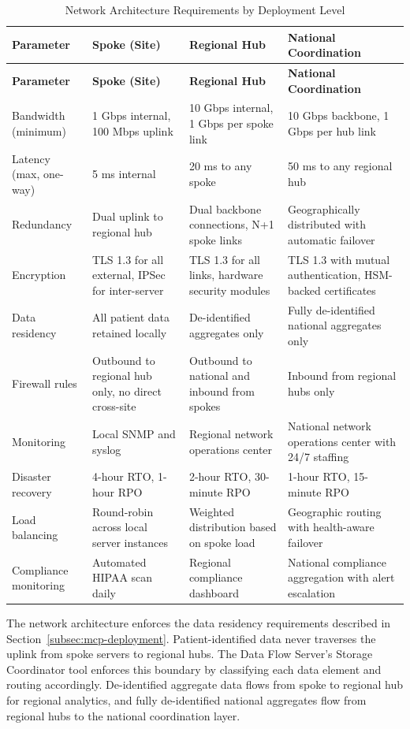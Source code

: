 \begin{longtable}{l p{3.5cm} p{3.5cm} p{4.0cm}}
\caption{Network Architecture Requirements by Deployment Level}
\label{tab:mcp-network-config} \\
\toprule
\textbf{Parameter} & \textbf{Spoke (Site)} & \textbf{Regional Hub} & \textbf{National Coordination} \\
\midrule
\endfirsthead
\toprule
\textbf{Parameter} & \textbf{Spoke (Site)} & \textbf{Regional Hub} & \textbf{National Coordination} \\
\midrule
\endhead
\bottomrule
\endfoot
\bottomrule
\endlastfoot
Bandwidth (minimum) & 1 Gbps internal, 100 Mbps uplink & 10 Gbps internal, 1 Gbps per spoke link & 10 Gbps backbone, 1 Gbps per hub link \\
\midrule
Latency (max, one-way) & 5 ms internal & 20 ms to any spoke & 50 ms to any regional hub \\
\midrule
Redundancy & Dual uplink to regional hub & Dual backbone connections, N+1 spoke links & Geographically distributed with automatic failover \\
\midrule
Encryption & TLS 1.3 for all external, IPSec for inter-server & TLS 1.3 for all links, hardware security modules & TLS 1.3 with mutual authentication, HSM-backed certificates \\
\midrule
Data residency & All patient data retained locally & De-identified aggregates only & Fully de-identified national aggregates only \\
\midrule
Firewall rules & Outbound to regional hub only, no direct cross-site & Outbound to national and inbound from spokes & Inbound from regional hubs only \\
\midrule
Monitoring & Local SNMP and syslog & Regional network operations center & National network operations center with 24/7 staffing \\
\midrule
Disaster recovery & 4-hour RTO, 1-hour RPO & 2-hour RTO, 30-minute RPO & 1-hour RTO, 15-minute RPO \\
\midrule
Load balancing & Round-robin across local server instances & Weighted distribution based on spoke load & Geographic routing with health-aware failover \\
\midrule
Compliance monitoring & Automated HIPAA scan daily & Regional compliance dashboard & National compliance aggregation with alert escalation \\
\end{longtable}

The network architecture enforces the data residency requirements described in
Section~\ref{subsec:mcp-deployment}. Patient-identified data never traverses
the uplink from spoke servers to regional hubs. The Data Flow Server's Storage
Coordinator tool enforces this boundary by classifying each data element and
routing accordingly. De-identified aggregate data flows from spoke to regional
hub for regional analytics, and fully de-identified national aggregates flow
from regional hubs to the national coordination layer.

